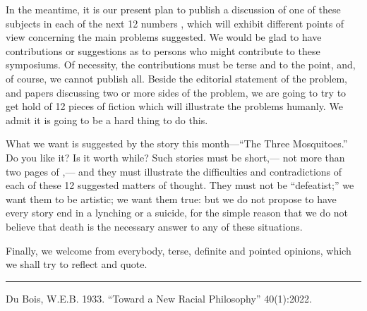 \documentclass[letterpaper,10pt,english]{jupyterBook}
\begin{document}
\sphinxAtStartPar
In the meantime, it is our present plan to publish a discussion of one of these subjects in each of the next 12 numbers , which will exhibit different points of view concerning the main problems suggested. We would be glad to have contributions or suggestions as to persons who might contribute to these symposiums. Of necessity, the contributions must be terse and to the point, and, of course, we cannot publish all. Beside the editorial statement of the problem, and papers discussing two or more sides of the problem, we are going to try to get hold of 12 pieces of fiction which will illustrate the problems humanly. We admit it is going to be a hard thing to do this.

\sphinxAtStartPar
What we want is suggested by the story this month—“The Three Mosquitoes.” Do you like it? Is it worth while? Such stories must be short,— not more than two pages of ,— and they must illustrate the difficulties and contradictions of each of these 12 suggested matters of thought. They must not be “defeatist;” we want them to be artistic; we want them true: but we do not propose to have every story end in a lynching or a suicide, for the simple reason that we do not believe that death is the necessary answer to any of these situations.

\sphinxAtStartPar
Finally, we welcome from everybody, terse, definite and pointed opinions, which we shall try to reflect and quote.


\bigskip\hrule\bigskip


\sphinxAtStartPar
{} Du Bois, W.E.B. 1933. “Toward a New Racial Philosophy”  40(1):20\sphinxhyphen{}22.
\end{document}
